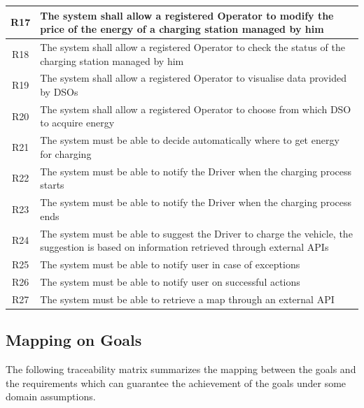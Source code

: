 \documentclass[../main.tex]{subfiles}
\begin{document}
\begin{center}
\begin{longtable}{| c | p{12cm} | }
\\
\hline
R17 & The system shall allow a registered Operator to modify the price of the energy of a charging station managed by him
\\
\hline
R18 & The system shall allow a registered Operator to check the status of the charging station managed by him
\\
\hline
R19 & The system shall allow a registered Operator to visualise data provided by DSOs
\\
\hline
R20 & The system shall allow a registered Operator to choose from which DSO to acquire energy
\\
\hline
R21 & The system must be able to decide automatically where to get energy for charging
\\
\hline
R22 & The system must be able to notify the Driver when the charging process starts
\\
\hline
R23 & The system must be able to notify the Driver when the charging process ends
\\
\hline
R24 & The system must be able to suggest the Driver to charge the vehicle, the suggestion is based on information retrieved through external APIs \\
\hline
R25 & The system must be able to notify user in case of exceptions
\\
\hline
R26 & The system must be able to notify user on successful actions
\\
\hline
R27 & The system must be able to retrieve a map through an external API
\\
\hline
\end{longtable}
\end{center}



\subsection{Mapping on Goals}
The following traceability matrix summarizes the mapping between the goals and the requirements which can guarantee the achievement of the goals under some domain assumptions. 
\end{document}
